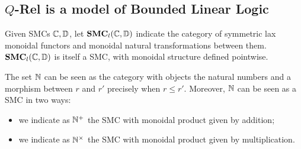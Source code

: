 %
%
%
%
%
%

%



%
%
%
%
%
%

\newpage


\subsection{$Q$-Rel is a model of Bounded Linear Logic}


Given SMCs $\mathbb{C},\mathbb{D}$,  let $\mathbf{SMC}_{l}(\mathbb{C}, \mathbb{D})$ indicate the category of symmetric lax monoidal functors and monoidal natural transformations between them.
$\mathbf{SMC}_{l}(\mathbb{C}, \mathbb{D})$  is itself a SMC, with monoidal structure defined pointwise.

The set 
$\mathbb{N}$ can be seen as the category with objects the natural numbers and a morphism between $r$ and $r'$ precisely when $r\leq r'$. 
Moreover, $\mathbb{N}$ can be seen as a SMC in two ways:
\begin{itemize}

\item we indicate as $\mathbb{N}^{+}$ the SMC with monoidal product given by addition;
\item we indicate as $\mathbb{N}^{\times}$ the SMC with monoidal product given by multiplication.
\end{itemize}


